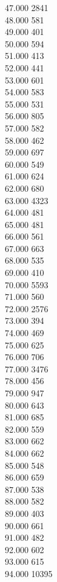 { 47.000	2841 \\
 48.000	581 \\
 49.000	401 \\
 50.000	594 \\
 51.000	413 \\
 52.000	441 \\
 53.000	601 \\
 54.000	583 \\
 55.000	531 \\
 56.000	805 \\
 57.000	582 \\
 58.000	462 \\
 59.000	697 \\
 60.000	549 \\
 61.000	624 \\
 62.000	680 \\
 63.000	4323 \\
 64.000	481 \\
 65.000	481 \\
 66.000	561 \\
 67.000	663 \\
 68.000	535 \\
 69.000	410 \\
 70.000	5593 \\
 71.000	560 \\
 72.000	2576 \\
 73.000	394 \\
 74.000	469 \\
 75.000	625 \\
 76.000	706 \\
 77.000	3476 \\
 78.000	456 \\
 79.000	947 \\
 80.000	643 \\
 81.000	685 \\
 82.000	559 \\
 83.000	662 \\
 84.000	662 \\
 85.000	548 \\
 86.000	659 \\
 87.000	538 \\
 88.000	582 \\
 89.000	403 \\
 90.000	661 \\
 91.000	482 \\
 92.000	602 \\
 93.000	615 \\
 94.000	10395 \\
}
